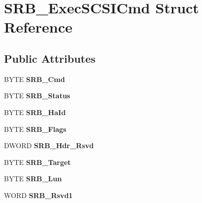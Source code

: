 \hypertarget{structSRB__ExecSCSICmd}{\section{S\-R\-B\-\_\-\-Exec\-S\-C\-S\-I\-Cmd Struct Reference}
\label{structSRB__ExecSCSICmd}
}
\subsection*{Public Attributes}
\begin{DoxyCompactItemize}
\item 
\hypertarget{structSRB__ExecSCSICmd_a5f40ff26b7542b2fef84baf546bc09c4}{B\-Y\-T\-E {\bfseries S\-R\-B\-\_\-\-Cmd}}\label{structSRB__ExecSCSICmd_a5f40ff26b7542b2fef84baf546bc09c4}

\item 
\hypertarget{structSRB__ExecSCSICmd_a3e46bacd1aa14a843e483362ce3102a2}{B\-Y\-T\-E {\bfseries S\-R\-B\-\_\-\-Status}}\label{structSRB__ExecSCSICmd_a3e46bacd1aa14a843e483362ce3102a2}

\item 
\hypertarget{structSRB__ExecSCSICmd_abb1e1d60695700781f7c2c565ade4aa1}{B\-Y\-T\-E {\bfseries S\-R\-B\-\_\-\-Ha\-Id}}\label{structSRB__ExecSCSICmd_abb1e1d60695700781f7c2c565ade4aa1}

\item 
\hypertarget{structSRB__ExecSCSICmd_a9f29e52749015a12f110d2bfaf0463ec}{B\-Y\-T\-E {\bfseries S\-R\-B\-\_\-\-Flags}}\label{structSRB__ExecSCSICmd_a9f29e52749015a12f110d2bfaf0463ec}

\item 
\hypertarget{structSRB__ExecSCSICmd_a15942b0450e76bc54c8b254b588fd4e3}{D\-W\-O\-R\-D {\bfseries S\-R\-B\-\_\-\-Hdr\-\_\-\-Rsvd}}\label{structSRB__ExecSCSICmd_a15942b0450e76bc54c8b254b588fd4e3}

\item 
\hypertarget{structSRB__ExecSCSICmd_ad34d9abb00d8dc8ca63078eb143c578b}{B\-Y\-T\-E {\bfseries S\-R\-B\-\_\-\-Target}}\label{structSRB__ExecSCSICmd_ad34d9abb00d8dc8ca63078eb143c578b}

\item 
\hypertarget{structSRB__ExecSCSICmd_a9a4503e0941be0b79dfcd2f7af467337}{B\-Y\-T\-E {\bfseries S\-R\-B\-\_\-\-Lun}}\label{structSRB__ExecSCSICmd_a9a4503e0941be0b79dfcd2f7af467337}

\item 
\hypertarget{structSRB__ExecSCSICmd_a02f84686f6bf9f3534db1fdee21c9c13}{W\-O\-R\-D {\bfseries S\-R\-B\-\_\-\-Rsvd1}}\label{structSRB__ExecSCSICmd_a02f84686f6bf9f3534db1fdee21c9c13}


\end{DoxyCompactItemize}
